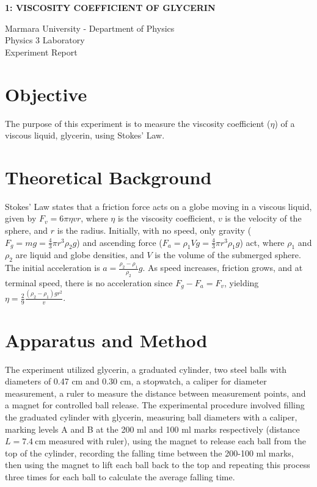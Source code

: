 \documentclass[12pt, a4paper]{article}
\begin{document}
\begin{center}
	\Large \textbf{1: VISCOSITY COEFFICIENT OF GLYCERIN}
	\vspace{0.5cm}
	    
	\normalsize Marmara University - Department of Physics \\
	Physics 3 Laboratory \\
	Experiment Report
	\vspace{0.5cm}
\end{center}

\section{Objective}
The purpose of this experiment is to measure the viscosity coefficient ($\eta$) of a viscous liquid, glycerin, using Stokes' Law.

\section{Theoretical Background}
Stokes' Law states that a friction force acts on a globe moving in a viscous liquid, given by $F_v = 6\pi\eta vr$, where $\eta$ is the viscosity coefficient, $v$ is the velocity of the sphere, and $r$ is the radius. Initially, with no speed, only gravity ($F_g = mg = \frac{4}{3}\pi r^3 \rho_2 g$) and ascending force ($F_a = \rho_1 V g = \frac{4}{3}\pi r^3 \rho_1 g$) act, where $\rho_1$ and $\rho_2$ are liquid and globe densities, and $V$ is the volume of the submerged sphere. The initial acceleration is $a = \frac{\rho_2 - \rho_1}{\rho_2}g$. As speed increases, friction grows, and at terminal speed, there is no acceleration since $F_g - F_a = F_v$, yielding $\eta = \frac{2}{9} \frac{(\rho_2 - \rho_1)g r^2}{v}$.

\section{Apparatus and Method}
The experiment utilized glycerin, a graduated cylinder, two steel balls with diameters of 0.47 cm and 0.30 cm, a stopwatch, a caliper for diameter measurement, a ruler to measure the distance between measurement points, and a magnet for controlled ball release. The experimental procedure involved filling the graduated cylinder with glycerin, measuring ball diameters with a caliper, marking levels A and B at the 200 ml and 100 ml marks respectively (distance $L = \SI{7.4}{\centi\metre}$ measured with ruler), using the magnet to release each ball from the top of the cylinder, recording the falling time between the 200-100 ml marks, then using the magnet to lift each ball back to the top and repeating this process three times for each ball to calculate the average falling time.
\end{document}
